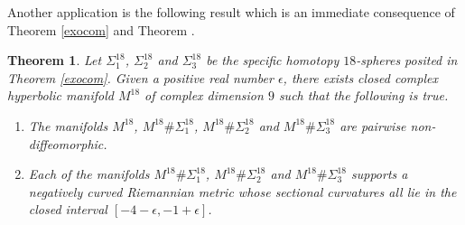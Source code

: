 \documentclass[a4paper,leqno,12pt]{amsart}
\theoremstyle{plain}
\newtheorem{theorem}{Theorem}[section]
\theoremstyle{definition}
\numberwithin{equation}{section}
\begin{document}
Another application is the following result which is an immediate  consequence of Theorem \ref{exocom} and Theorem \cite[Theorem 1.4]{Ram14}.
\begin{theorem} \label{exocomhyp}
Let $\Sigma^{18}_1$, $\Sigma^{18}_2$ and $\Sigma^{18}_3$ be the specific homotopy $18$-spheres  posited in Theorem \ref{exocom}.
Given a positive real number $\epsilon$, there exists closed complex hyperbolic manifold $M^{18}$ of complex dimension $9$  such that the following is true.
\begin{enumerate}
\item[\rm{(i)}] The manifolds $M^{18}$, $M^{18}\#\Sigma^{18}_1$, $M^{18}\#\Sigma^{18}_2$ and $M^{18}\#\Sigma^{18}_3$ are pairwise non-diffeomorphic.
\item[\rm{(ii)}] Each of the manifolds $M^{18}\#\Sigma^{18}_1$, $M^{18}\#\Sigma^{18}_2$ and $M^{18}\#\Sigma^{18}_3$ supports a negatively curved Riemannian metric whose sectional curvatures all lie in the closed interval $[-4 -\epsilon, -1 +\epsilon]$.
\end{enumerate}
\end{theorem}

\mbox{ }\\
\end{document}
